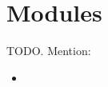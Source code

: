 \section{Modules} %
\label{sec:modules_implementation}
TODO. Mention:
\begin{itemize}
	\item 
\end{itemize}

